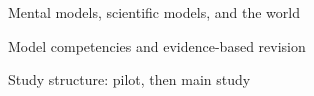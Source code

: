 \documentclass[aspectratio=169]{beamer}
\begin{document}
\begin{frame}{Mental models, scientific models, and the world}
\centering\competenciesfalse\resizebox{.94\textwidth}{!}{}
\end{frame}
\begin{frame}{Model competencies and evidence-based revision}
\centering\competenciestrue\resizebox{.88\textwidth}{!}{}
\end{frame}
\begin{frame}{Study structure: pilot, then main study}
\centering\resizebox{!}{5.35cm}{}
\end{frame}
\end{document}
